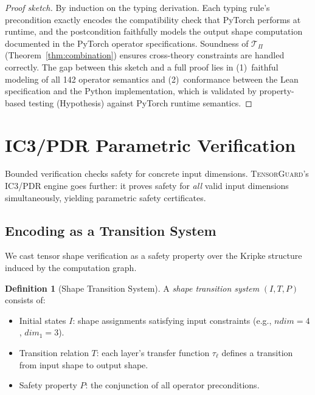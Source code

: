 \documentclass[10pt]{article}
\newcommand{\tguard}{\textsc{TensorGuard}}
\newcommand{\Tprod}{\mathcal{T}_{\Pi}}
\theoremstyle{plain}
\theoremstyle{definition}
\newtheorem{definition}[theorem]{Definition}
\theoremstyle{remark}
\begin{document}
\begin{proof}[Proof sketch]
By induction on the typing derivation.  Each typing rule's
precondition exactly encodes the compatibility check that PyTorch
performs at runtime, and the postcondition faithfully models the
output shape computation documented in the PyTorch operator
specifications.  Soundness of $\Tprod$ (Theorem~\ref{thm:combination})
ensures cross-theory constraints are handled correctly.  The gap
between this sketch and a full proof lies in (1)~faithful modeling
of all 142 operator semantics and (2)~conformance between the Lean
specification and the Python implementation, which is validated by
property-based testing (Hypothesis) against PyTorch runtime
semantics.
\end{proof}


\section{IC3/PDR Parametric Verification}\label{sec:ic3}

Bounded verification checks safety for concrete input dimensions.
\tguard{}'s IC3/PDR engine goes further: it proves safety for
\emph{all} valid input dimensions simultaneously, yielding
parametric safety certificates.

\subsection{Encoding as a Transition System}

We cast tensor shape verification as a safety property over the
Kripke structure induced by the computation graph.

\begin{definition}[Shape Transition System]
A \emph{shape transition system} $(I, T, P)$ consists of:
\begin{itemize}[nosep]
  \item Initial states $I$: shape assignments satisfying input
    constraints (e.g., $\mathit{ndim} = 4$, $\mathit{dim}_1 = 3$).
  \item Transition relation $T$: each layer's transfer function
    $\tau_\ell$ defines a transition from input shape to output
    shape.
  \item Safety property $P$: the conjunction of all operator
    preconditions.
\end{itemize}
\end{definition}
\end{document}
